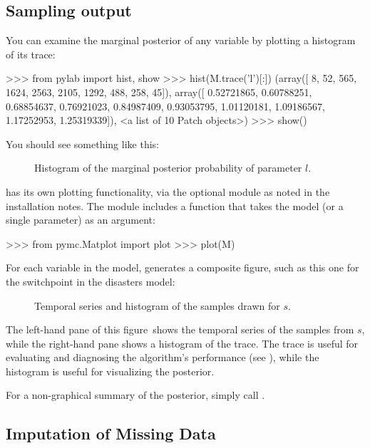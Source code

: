 \documentclass[]{jss}
\begin{document}
\subsection{Sampling output}
You can examine the marginal posterior of any variable by plotting a histogram of its trace:
\begin{CodeInput}
>>> from pylab import hist, show
>>> hist(M.trace('l')[:])
(array([   8,   52,  565, 1624, 2563, 2105, 1292,  488,  258,   45]),
array([ 0.52721865,  0.60788251,  0.68854637,  0.76921023,  0.84987409,
       0.93053795,  1.01120181,  1.09186567,  1.17252953,  1.25319339]),
<a list of 10 Patch objects>)
>>> show()
\end{CodeInput}
You should see something like this:
\begin{figure}[h!]
\begin{center}
   \caption{Histogram of the marginal posterior probability of parameter $l$.}
\end{center}
\end{figure}
 has its own plotting functionality, via the optional
 module as noted in the installation notes. The
 module includes a  function that takes the
model (or a single parameter) as an argument:
\begin{CodeInput}
>>> from pymc.Matplot import plot
>>> plot(M)
\end{CodeInput}
For each variable in the model,  generates a composite figure, such as this one for the switchpoint in the disasters model:
\begin{figure}[h!]
\begin{center}
   \caption{Temporal series and histogram of the samples drawn for $s$. }
\end{center}
\end{figure}

The left-hand pane of this figure~shows the temporal series of the samples from $s$, while the right-hand pane shows a histogram of the trace. The trace is useful for evaluating and diagnosing the algorithm's performance (see \cite*{gelman}), while the histogram is useful for visualizing the posterior.

For a non-graphical summary of the posterior, simply call .


\subsection{Imputation of Missing Data}
\end{document}

